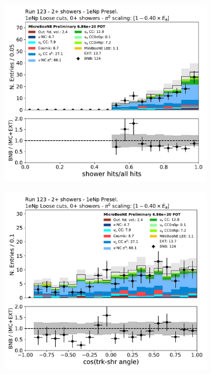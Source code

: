\begin{figure}[H]
    \begin{center}
    \begin{subfigure}{0.45\textwidth}
    \includegraphics[width=1.00\textwidth]{Sidebands/Figures/1eNp/TwoShower/TwoPShr_NP_NPLAllShr_pi0e040/hits_ratio.pdf}
    \end{subfigure}
    \begin{subfigure}{0.45\textwidth}
    \includegraphics[width=1.00\textwidth]{Sidebands/Figures/1eNp/TwoShower/TwoPShr_NP_NPLAllShr_pi0e040/tksh_angle.pdf}

\end{subfigure}
\end{center}
\end{figure}
